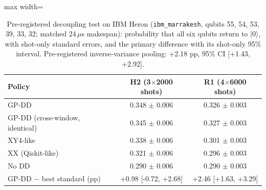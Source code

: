 \begin{table}[t]
\centering
\caption{Pre-registered decoupling test on IBM Heron (\texttt{ibm\_marrakesh}, qubits 55, 54, 53, 39, 33, 32; matched 24\,$\mu$s makespan): probability that all six qubits return to $|0\rangle$, with shot-only standard errors, and the primary difference with its shot-only 95\% interval. Pre-registered inverse-variance pooling: +2.18 pp, 95\% CI [+1.43, +2.92].}\label{tab:hw}
\footnotesize
\begin{adjustbox}{max width=\columnwidth}
\begin{tabular}{lcc}
\toprule
Policy & H2 (3$\times$2000 shots) & R1 (4$\times$6000 shots) \\
\midrule
GP-DD & 0.348 $\pm$ 0.006 & 0.326 $\pm$ 0.003 \\
GP-DD (cross-window, identical) & 0.345 $\pm$ 0.006 & 0.327 $\pm$ 0.003 \\
XY4-like & 0.338 $\pm$ 0.006 & 0.301 $\pm$ 0.003 \\
XX (Qiskit-like) & 0.321 $\pm$ 0.006 & 0.296 $\pm$ 0.003 \\
No DD & 0.290 $\pm$ 0.006 & 0.290 $\pm$ 0.003 \\
GP-DD $-$ best standard (pp) & +0.98 [-0.72, +2.68] & +2.46 [+1.63, +3.29] \\
\bottomrule
\end{tabular}
\end{adjustbox}
\end{table}

